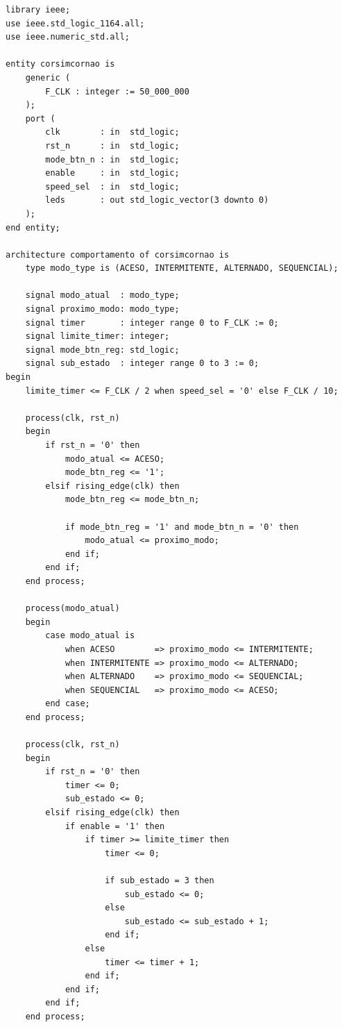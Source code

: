 \documentclass[12pt,a4paper, brazil]{article}
\begin{document}
\begin{lstlisting}[style=vhdl, caption={Arquivo \texttt{corsimcornao.vhd}.}]
library ieee;
use ieee.std_logic_1164.all;
use ieee.numeric_std.all;

entity corsimcornao is
    generic (
        F_CLK : integer := 50_000_000
    );
    port (
        clk        : in  std_logic;
        rst_n      : in  std_logic;
        mode_btn_n : in  std_logic;
        enable     : in  std_logic;
        speed_sel  : in  std_logic;
        leds       : out std_logic_vector(3 downto 0)
    );
end entity;

architecture comportamento of corsimcornao is
    type modo_type is (ACESO, INTERMITENTE, ALTERNADO, SEQUENCIAL);

    signal modo_atual  : modo_type;
    signal proximo_modo: modo_type;
    signal timer       : integer range 0 to F_CLK := 0;
    signal limite_timer: integer;
    signal mode_btn_reg: std_logic;
    signal sub_estado  : integer range 0 to 3 := 0;
begin
    limite_timer <= F_CLK / 2 when speed_sel = '0' else F_CLK / 10;

    process(clk, rst_n)
    begin
        if rst_n = '0' then
            modo_atual <= ACESO;
            mode_btn_reg <= '1';
        elsif rising_edge(clk) then
            mode_btn_reg <= mode_btn_n;

            if mode_btn_reg = '1' and mode_btn_n = '0' then
                modo_atual <= proximo_modo;
            end if;
        end if;
    end process;

    process(modo_atual)
    begin
        case modo_atual is
            when ACESO        => proximo_modo <= INTERMITENTE;
            when INTERMITENTE => proximo_modo <= ALTERNADO;
            when ALTERNADO    => proximo_modo <= SEQUENCIAL;
            when SEQUENCIAL   => proximo_modo <= ACESO;
        end case;
    end process;

    process(clk, rst_n)
    begin
        if rst_n = '0' then
            timer <= 0;
            sub_estado <= 0;
        elsif rising_edge(clk) then
            if enable = '1' then
                if timer >= limite_timer then
                    timer <= 0;

                    if sub_estado = 3 then
                        sub_estado <= 0;
                    else
                        sub_estado <= sub_estado + 1;
                    end if;
                else
                    timer <= timer + 1;
                end if;
            end if;
        end if;
    end process;


\end{lstlisting}
\end{document}
